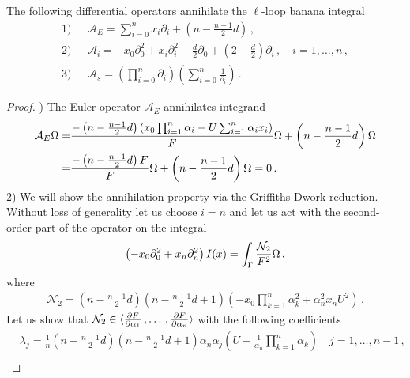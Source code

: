 \documentclass[10pt,a4paper]{amsart}
\begin{document}
\begin{theorem}\label{prop:operators}
The following differential operators annihilate the $\ell$-loop banana integral
\begin{align}
1) \,\,\,\, &\mathcal{A}_{E} = \sum_{i=0}^{n} x_{i}\partial_{i} + \left(n - \frac{n-1}{2}d \right) \,, \\
2) \,\,\,\, &\mathcal{A}_{i} = - x_{0}\partial_{0}^{2} + x_{i} \partial_{i}^{2} -\frac{d}{2} \partial_{0} + \left(2-\frac{d}{2} \right)\partial_{i}    \,, \quad  i=1, \ldots , n \,, \\
3) \,\,\,\, &\mathcal{A}_{s} = \left( \prod_{i=0}^{n} \partial_{i} \right) \left( \sum_{i=0}^{n} \frac{1}{\partial_{i}} \right)  \,.  
\end{align}
\end{theorem}

\begin{proof}
\hfill {}) The Euler operator $\mathcal{A}_{E}$ annihilates integrand
\begin{align}
\begin{split}
\mathcal{A}_{E} \Omega =& \frac{-\left(n - \frac{n-1}{2}d\right)\left( x_{0}\prod_{i=1}^{n}\alpha_{i} - {\rm U}\sum_{i=1}^{n} \alpha_{i} x_{i} \right)}{{\rm F}}\Omega + \left(n - \frac{n-1}{2}d \right) \Omega  \\
=&\frac{-\left(n - \frac{n-1}{2}d \right){\rm F}}{{\rm F}}\Omega + \left(n - \frac{n-1}{2}d \right) \Omega = 0 \,. 
\end{split}
\end{align}
2) We will show the annihilation property via the Griffiths-Dwork reduction. Without loss of generality let us choose $i=n$ and let us act with the second-order part of the operator on the integral
\begin{align}
\left( - x_{0}\partial_{0}^{2} + x_{n} \partial_{n}^{2} \right) I(x) = \int_{\Gamma} \frac{\mathcal{N}_{2}}{{\rm F}^{2}} \Omega \,, 
\end{align}
where
\begin{align}
\mathcal{N}_{2} = \left(  n - \frac{n-1}{2}d \right) \left(  n - \frac{n-1}{2}d +1 \right)\left( -x_{0} \prod_{k=1}^{n}\alpha_{k}^{2} + \alpha_{n}^{2} x_{n} U^{2}  \right) \,.   
\end{align}
Let us show that $\mathcal{N}_{2} \in \langle \frac{\partial {\rm F}}{\partial \alpha_{1}} \,, \hdots \,, \frac{\partial {\rm F}}{\partial \alpha_{n}}  \rangle$ with the following coefficients
\begin{align}
&\lambda_{j} = \frac{1}{n}\left(  n - \frac{n-1}{2}d \right) \left(  n - \frac{n-1}{2}d +1 \right) \alpha_{n} \alpha_{j} \left( U - \frac{1}{\alpha_{n}}\prod_{k=1}^{n} \alpha_{k} \right) \quad j = 1, \hdots , n-1 \,, \\

\end{align}
\end{proof}
\end{document}
